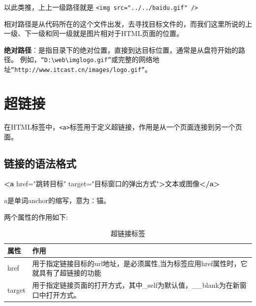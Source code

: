 \documentclass[
]{book}
\newenvironment{Shaded}{\begin{snugshade}}{\end{snugshade}}
\newcommand{\KeywordTok}[1]{\textcolor[rgb]{0.13,0.29,0.53}{\textbf{#1}}}
\newcommand{\NormalTok}[1]{#1}
\newcommand{\OtherTok}[1]{\textcolor[rgb]{0.56,0.35,0.01}{#1}}
\newcommand{\StringTok}[1]{\textcolor[rgb]{0.31,0.60,0.02}{#1}}
\begin{document}
以此类推，上上一级路径就是 \texttt{\textless{}img\ src="../../baidu.gif"\ /\textgreater{}}

相对路径是从代码所在的这个文件出发，去寻找目标文件的，而我们这里所说的上一级、下一级和同一级就是图片相对于HTML页面的位置。

\textbf{绝对路径}︰是指目录下的绝对位置，直接到达目标位置，通常是从盘符开始的路径。
例如，\texttt{“D:\textbackslash{}web\textbackslash{}imglogo.gif”}或完整的网络地址\texttt{“http://www.itcast.cn/images/logo.gif”}。

\hypertarget{ux8d85ux94feux63a5}{%
\section{超链接}\label{ux8d85ux94feux63a5}}

在HTML标签中，\texttt{\textless{}a\textgreater{}}标签用于定义超链接，作用是从一个页面连接到另一个页面。

\hypertarget{ux94feux63a5ux7684ux8bedux6cd5ux683cux5f0f}{%
\subsection{链接的语法格式}\label{ux94feux63a5ux7684ux8bedux6cd5ux683cux5f0f}}

\begin{Shaded}
\begin{Highlighting}[]
\KeywordTok{\textless{}a}\OtherTok{ href=}\StringTok{"跳转目标"}\OtherTok{ target=}\StringTok{"目标窗口的弹出方式"}\KeywordTok{\textgreater{}}\NormalTok{文本或图像}\KeywordTok{\textless{}/a\textgreater{}}
\end{Highlighting}
\end{Shaded}

a是单词anchor的缩写，意为∶锚。

两个属性的作用如下:

\begin{table}

\caption{\label{tab:unnamed-chunk-12}超链接标签}
\centering
\begin{tabular}[t]{ll}
\toprule
属性 & 作用\\
\midrule
href & 用于指定链接目标的url地址，是必须属性,当为标签应用href属性时，它就具有了超链接的功能\\
target & 用于指定链接页面的打开方式，其中\_self为默认值，\_\_blank为在新窗口中打开方式。\\
\bottomrule
\end{tabular}
\end{table}
\end{document}
